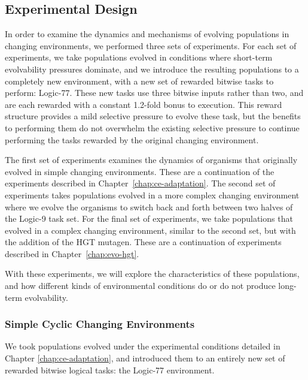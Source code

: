 \documentclass[PhD]{msu-thesis}
\begin{document}
\subsection{Experimental Design}
In order to examine the dynamics and mechanisms of evolving populations in changing environments, we performed three sets of experiments. For each set of experiments, we take populations evolved in conditions where short-term evolvability pressures dominate, and we introduce the resulting populations to a completely new environment, with a new set of rewarded bitwise tasks to perform: Logic-77. These new tasks use three bitwise inputs rather than two, and are each rewarded with a constant 1.2-fold bonus to execution. This reward structure provides a mild selective pressure to evolve these task, but the benefits to performing them do not overwhelm the existing selective pressure to continue performing the tasks rewarded by the original changing environment. 

The first set of experiments examines the dynamics of organisms that originally evolved in simple changing environments. These are a continuation of the experiments described in Chapter~\ref{chap:ce-adaptation}. The second set of experiments takes populations evolved in a more complex changing environment where we evolve the organisms to switch back and forth between two halves of the Logic-9 task set. For the final set of experiments, we take populations that evolved in a complex changing environment, similar to the second set, but with the addition of the HGT mutagen. These are a continuation of experiments described in Chapter~\ref{chap:evo-hgt}.

With these experiments, we will explore the characteristics of these populations, and how different kinds of environmental conditions do or do not produce long-term evolvability.  

\subsubsection{Simple Cyclic Changing Environments}
We took populations evolved under the experimental conditions detailed in Chapter \ref{chap:ce-adaptation}, and introduced them to an entirely new set of rewarded bitwise logical tasks: the Logic-77 environment. 

\end{document}
